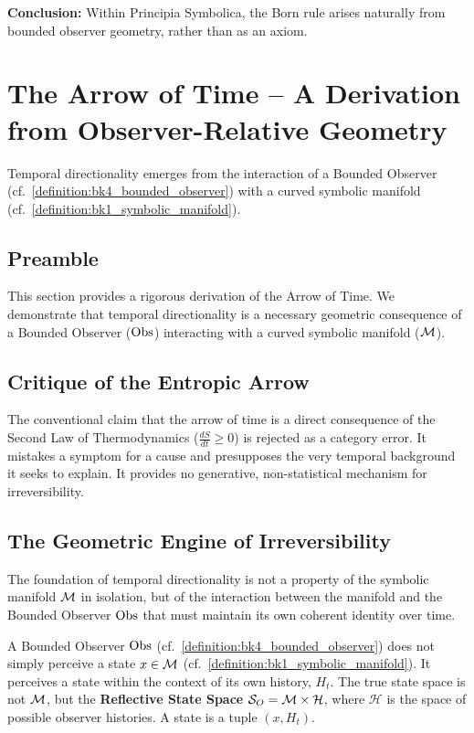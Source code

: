 \medskip

\noindent
\textbf{Conclusion:} Within Principia Symbolica, the Born rule arises naturally
from bounded observer geometry, rather than as an axiom.

\section[The Arrow of Time]{The Arrow of Time – A Derivation from Observer-Relative Geometry}
\label{sec:appC_arrow_of_time_rigorous}
Temporal directionality emerges from the interaction of a Bounded Observer (cf.~\ref{definition:bk4_bounded_observer}) with a curved symbolic manifold (cf.~\ref{definition:bk1_symbolic_manifold}).

\subsection*{Preamble}
\label{subsec:appC_time_preamble_rigorous}
This section provides a rigorous derivation of the Arrow of Time. We demonstrate that temporal directionality is a necessary geometric consequence of a Bounded Observer (\(\mathrm{Obs}\)) interacting with a curved symbolic manifold (\(\mathcal{M}\)).

\subsection{Critique of the Entropic Arrow}
\label{subsec:appC_time_critique_rigorous}
The conventional claim that the arrow of time is a direct consequence of the Second Law of Thermodynamics ($\frac{dS}{dt} \geq 0$) is rejected as a category error. It mistakes a symptom for a cause and presupposes the very temporal background it seeks to explain. It provides no generative, non-statistical mechanism for irreversibility.

\subsection{The Geometric Engine of Irreversibility}
\label{subsec:appC_time_geometric_engine_final}
The foundation of temporal directionality is not a property of the symbolic manifold \(\mathcal{M}\) in isolation, but of the interaction between the manifold and the Bounded Observer \(\mathrm{Obs}\) that must maintain its own coherent identity over time.

\begin{definition}
\label{definition:appC_reflective_state_space}
A Bounded Observer \(\mathrm{Obs}\) (cf.~\ref{definition:bk4_bounded_observer}) does not simply perceive a state \(x \in \mathcal{M}\) (cf.~\ref{definition:bk1_symbolic_manifold}). It perceives a state within the context of its own history, \(H_t\). The true state space is not \(\mathcal{M}\), but the \textbf{Reflective State Space} \(\mathcal{S}_O = \mathcal{M} \times \mathcal{H}\), where \(\mathcal{H}\) is the space of possible observer histories. A state is a tuple \((x, H_t)\).
\end{definition}

